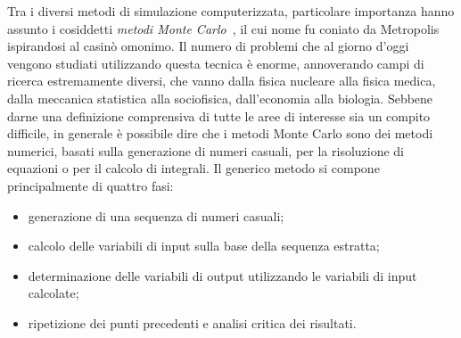 Tra i diversi metodi di simulazione computerizzata, particolare importanza hanno assunto i cosiddetti \emph{metodi Monte Carlo}~\cite{metropolis:jasa49}, il cui nome fu coniato da Metropolis ispirandosi al casinò omonimo.
%
Il numero di problemi che al giorno d'oggi vengono studiati utilizzando questa tecnica è enorme, annoverando campi di ricerca estremamente diversi, che vanno dalla fisica nucleare alla fisica medica, dalla meccanica statistica alla sociofisica, dall'economia alla biologia.
%
%
%
Sebbene darne una definizione comprensiva di tutte le aree di interesse sia un compito difficile, in generale è possibile dire che i metodi Monte Carlo sono dei metodi numerici, basati sulla generazione di numeri casuali, per la risoluzione di equazioni o per il calcolo di integrali.
Il generico metodo si compone principalmente di quattro fasi:
\begin{itemize}
	\item generazione di una sequenza di numeri casuali;
	\item calcolo delle variabili di input sulla base della sequenza estratta;
	\item determinazione delle variabili di output utilizzando le variabili di input calcolate;
	\item ripetizione dei punti precedenti e analisi critica dei risultati.
\end{itemize}



